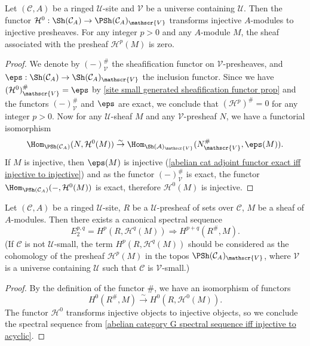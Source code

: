 \begin{proposition}\label{ringed site change universe cohomology prop}
Let $(\mathcal{C},A)$ be a ringed $\mathscr{U}$-site and $\mathscr{V}$ be a universe containing $\mathscr{U}$. Then the functor $\mathcal{H}^0:\Sh(\mathcal{C}_A)\to \PSh(\mathcal{C}_A)_\mathscr{V}$ transforms injective $A$-modules to injective presheaves. For any integer $p>0$ and any $A$-module $M$, the sheaf associated with the presheaf $\mathcal{H}^p(M)$ is zero.
\end{proposition}
\begin{proof}
We denote by $(-)^\#_\mathscr{V}$ the sheafification functor on $\mathscr{V}$-presheaves, and $\eps:\Sh(\mathcal{C}_A)\to \Sh(\mathcal{C}_A)_\mathscr{V}$ the inclusion functor. Since we have $(\mathcal{H}^0)^\#_\mathscr{V}=\eps$ by \cref{site small generated sheafification functor prop} and the functors $(-)^\#_\mathscr{V}$ and $\eps$ are exact, we conclude that $(\mathcal{H}^p)^\#=0$ for any integer $p>0$. Now for any $\mathscr{U}$-sheaf $M$ and any $\mathscr{V}$-presheaf $N$, we have a functorial isomorphism
\[\Hom_{\PSh(\mathcal{C}_A)}(N,\mathcal{H}^0(M)) \stackrel{\sim}{\to } \Hom_{\Sh(\mathcal{A})_\mathscr{V}}(N^\#_\mathscr{V},\eps(M)).\]
If $M$ is injective, then $\eps(M)$ is injective (\cref{abelian cat adjoint functor exact iff injective to injective}) and as the functor $(-)^\#_\mathscr{V}$ is exact, the functor $\Hom_{\PSh(\mathcal{C}_A)}(-,\mathcal{H}^0(M))$ is exact, therefore $\mathcal{H}^0(M)$ is injective.
\end{proof}

\begin{theorem}\label{ringed site Leray spectral sequence for presheaf functor}
Let $(\mathcal{C},A)$ be a ringed $\mathscr{U}$-site, $R$ be a $\mathscr{U}$-presheaf of sets over $\mathcal{C}$, $M$ be a sheaf of $A$-modules. Then there exists a canonical spectral sequence
\begin{equation}\label{ringed site Leray spectral sequence for presheaf functor-1}
E_2^{p,q}=H^p(R,\mathcal{H}^q(M))\Rightarrow H^{p+q}(R^\#,M).
\end{equation}
(If $\mathcal{C}$ is not $\mathscr{U}$-small, the term $H^p(R,\mathcal{H}^q(M))$ should be considered as the cohomology of the presheaf $\mathcal{H}^p(M)$ in the topos $\PSh(\mathcal{C}_A)_\mathscr{V}$, where $\mathscr{V}$ is a universe containing $\mathscr{U}$ such that $\mathcal{C}$ is $\mathscr{V}$-small.)
\end{theorem}
\begin{proof}
By the definition of the functor $\#$, we have an isomorphism of functors
\[H^0(R^\#,M) \stackrel{\sim}{\to } H^0(R,\mathcal{H}^0(M)).\]
The functor $\mathcal{H}^0$ transforms injective objects to injective objects, so we conclude the spectral sequence from \cref{abelian category G spectral sequence iff injective to acyclic}.
\end{proof}

